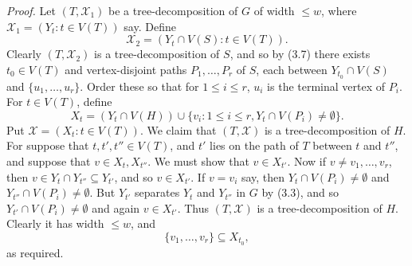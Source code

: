 \textit{Proof.} Let $(T, \mathcal{X}_1)$ be a tree-decomposition of $G$ of width $\le w$, where $\mathcal{X}_1 = (Y_t : t \in V(T))$ say. Define
\begin{equation*}
\mathcal{X}_2 = (Y_t \cap V(S) : t \in V(T)).
\end{equation*}
Clearly $(T, \mathcal{X}_2)$ is a tree-decomposition of $S$, and so by (3.7) there exists $t_0 \in V(T)$ and vertex-disjoint paths $P_1, \dots, P_r$ of $S$, each between $Y_{t_0} \cap V(S)$ and $\{u_1, \dots, u_r\}$. Order these so that for $1 \le i \le r$, $u_i$ is the terminal vertex of $P_i$. For $t \in V(T)$, define
\begin{equation*}
X_t = (Y_t \cap V(H)) \cup \{v_i : 1 \le i \le r, Y_t \cap V(P_i) \ne \emptyset\}.
\end{equation*}
Put $\mathcal{X} = (X_t : t \in V(T))$. We claim that $(T, \mathcal{X})$ is a tree-decomposition of $H$. For suppose that $t, t', t'' \in V(T)$, and $t'$ lies on the path of $T$ between $t$ and $t''$, and suppose that $v \in X_t, X_{t''}$. We must show that $v \in X_{t'}$. Now if $v \ne v_1, \dots, v_r$, then $v \in Y_t \cap Y_{t''} \subseteq Y_{t'}$, and so $v \in X_{t'}$. If $v = v_i$ say, then $Y_t \cap V(P_i) \ne \emptyset$ and $Y_{t''} \cap V(P_i) \ne \emptyset$. But $Y_{t'}$ separates $Y_t$ and $Y_{t''}$ in $G$ by (3.3), and so $Y_{t'} \cap V(P_i) \ne \emptyset$ and again $v \in X_{t'}$. Thus $(T, \mathcal{X})$ is a tree-decomposition of $H$. Clearly it has width $\le w$, and
\begin{equation*}
\{v_1, \dots, v_r\} \subseteq X_{t_0},
\end{equation*}
as required.
